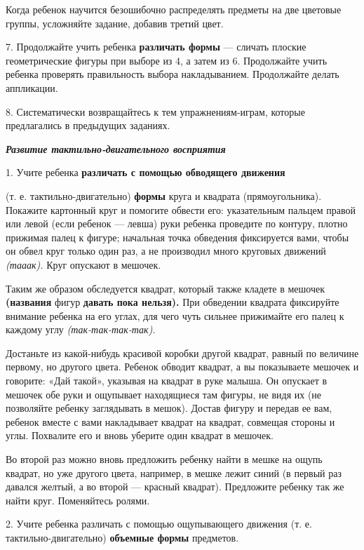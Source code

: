 \documentclass[a5paper]{book}
\renewcommand{\emph}[1]{\textit{#1}}
\begin{document}
Когда ребенок научится безошибочно распределять предметы на две цветовые
группы, усложняйте задание, добавив третий цвет.

7. Продолжайте учить ребенка \textbf{различать формы} --- сличать
плоские геометрические фигуры при выборе из 4, а затем из 6. Продолжайте
учить ребенка проверять правильность выбора накладыванием. Продолжайте
делать аппликации.

8. Систематически возвращайтесь к тем упражнениям-играм, которые
предлагались в предыдущих заданиях.

\emph{\textbf{Развитие тактильно-двигательного восприятия}}

1. Учите ребенка \textbf{различать с помощью обводящего движения}

(т. е. тактильно-двигательно) \textbf{формы} круга и квадрата
(прямоугольника). Покажите картонный круг и помогите обвести его:
указательным пальцем правой или левой (если ребенок --- левша) руки
ребенка проведите по контуру, плотно прижимая палец к фигуре; начальная
точка обведения фиксируется вами, чтобы он обвел круг только один раз, а
не производил много круговых движений \emph{(тааак).} Круг опускают в
мешочек.

Таким же образом обследуется квадрат, который также кладете в мешочек
\textbf{(названия} фигур \textbf{давать пока нельзя).} При обведении
квадрата фиксируйте внимание ребенка на его углах, для чего чуть сильнее
прижимайте его палец к каждому углу \emph{(так-так-так-так).}

Достаньте из какой-нибудь красивой коробки другой квадрат, равный по
величине первому, но другого цвета. Ребенок обводит квадрат, а вы
показываете мешочек и говорите: «Дай такой», указывая на квадрат в руке
малыша. Он опускает в мешочек обе руки и ощупывает находящиеся там
фигуры, не видя их (не позволяйте ребенку заглядывать в мешок). Достав
фигуру и передав ее вам, ребенок вместе с вами накладывает квадрат на
квадрат, совмещая стороны и углы. Похвалите его и вновь уберите один
квадрат в мешочек.

Во второй раз можно вновь предложить ребенку найти в мешке на ощупь
квадрат, но уже другого цвета, например, в мешке лежит синий (в первый
раз давался желтый, а во второй --- красный квадрат). Предложите ребенку
так же найти круг. Поменяйтесь ролями.

2. Учите ребенка различать с помощью ощупывающего движения (т. е.
тактильно-двигательно) \textbf{объемные формы} предметов.
\end{document}
